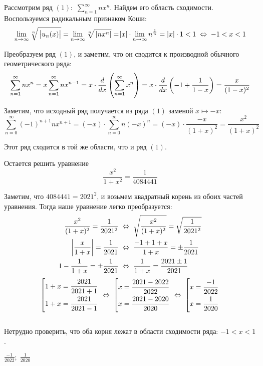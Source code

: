  {
    Рассмотрим ряд $(1)\colon$ $\displaystyle \sum_{n=1}^{\infty}nx^n$. Найдем его область сходимости. Воспользуемся радикальным признаком Коши:
    $$\lim_{n \to \infty} \sqrt[n]{\ \abs{u_n(x)}} = \lim_{n \to \infty} \sqrt[n]{\ \abs{nx^n}} = \abs{x} \cdot \lim_{n \to \infty} n^{\frac 1n} = |x| \cdot 1 < 1 \;\Leftrightarrow\;-1<x<1$$

    Преобразуем ряд $(1)$, и заметим, что он сводится к производной обычного геометрического ряда:
    $$\sum_{n=1}^{\infty}nx^n = x\sum_{n=1}^{\infty}nx^{n-1}=x \cdot \frac{d}{dx}\left( {\sum_{n=1}^{\infty}x^n} \right)=x\cdot\frac{d}{dx}\left( {-1+\frac1{1-x}} \right)=\frac{x}{(1-x)^2}$$

    Заметим, что исходный ряд получается из ряда $(1)$ заменой $x \mapsto -x$:
    $$\sum_{n=0}^{\infty}(-1)^{n+1}nx^{n+1}=(-x)\cdot\sum_{n=0}^{\infty}n(-x)^n=(-x)\cdot\frac{-x}{(1+x)^2}=\frac{x^2}{(1+x)^2}$$

    Этот ряд сходится в той же области, что и ряд $(1)$.

    Остается решить уравнение
    $$\frac{x^2}{1+x^2}=\frac1{4084441}$$

    Заметим, что $4084441=2021^2$, и возьмем квадратный корень из обоих частей уравнения. Тогда наше уравнение легко преобразуется:
    \begin{align*}
        \frac{x^2}{(1+x)^2} = \frac1{2021^2} \; &\Leftrightarrow \; \sqrt{\frac{x^2}{(1+x)^2}} = \sqrt{\frac1{2021^2}}\\
        \abs{\frac{x}{1+x}} = \frac1{2021} \;  &\Leftrightarrow \; \frac{-1+1+x}{1+x} = \pm\frac1{2021}\\
        1-\frac1{1+x} = \pm\frac1{2021} \;  &\Leftrightarrow \;
        \frac1{1+x} = \frac{2021\pm1}{2021}\\
    \end{align*}
    $$\left[ \begin{gathered}
        1+x=\frac{2021}{2021+1}\\
        1+x=\frac{2021}{2021-1}\hfill
    \end{gathered} \right.
    \;\Leftrightarrow \;
    \left[ \begin{gathered}
        x=\frac{2021-2022}{2022}\\
        x=\frac{2021-2020}{2020}\hfill
    \end{gathered} \right.
    \;\Leftrightarrow \;
    \left[ \begin{gathered}
        x=\frac{-1}{2022}\\
        x=\frac{1}{2020}\hfill
    \end{gathered} \right.
    $$\\[4mm]
    
    Нетрудно проверить, что оба корня лежат в области сходимости ряда: $-1 <x <1$.
}{ $\frac{-1}{2022};\;\frac{1}{2020}$ }\newpage

